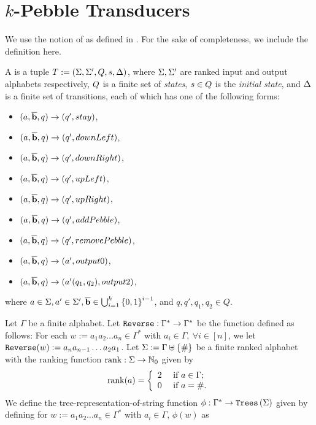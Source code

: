 \section{\texorpdfstring{$k$}{k}-Pebble Transducers}\label{sec:kPebbleTransducers}

We use the notion of  as defined in \cite{MSV2000}. For the sake of completeness, we include the definition here.

\begin{definition}
    A \emph{} is a tuple $T := (\Sigma, \Sigma', Q, s, \Delta)$, where $\Sigma, \Sigma'$ are ranked input and output alphabets respectively, $Q$ is a finite set of \emph{states}, $s \in Q$ is the \emph{initial state}, and $\Delta$ is a finite set of transitions, each of which has one of the following forms:
    \begin{itemize}
        \item $(a, \overline{\textbf{b}}, q) \to (q', stay)$,
        \item $(a, \overline{\textbf{b}}, q) \to (q', downLeft)$,
        \item $(a, \overline{\textbf{b}}, q) \to (q', downRight)$,
        \item $(a, \overline{\textbf{b}}, q) \to (q'
        , upLeft)$,
        \item $(a, \overline{\textbf{b}}, q) \to (q', upRight)$,
        \item $(a, \overline{\textbf{b}}, q) \to (q', addPebble)$,
        \item $(a, \overline{\textbf{b}}, q) \to (q', removePebble)$,
        \item $(a, \overline{\textbf{b}}, q) \to (a', output0)$,
        \item $(a, \overline{\textbf{b}}, q) \to (a'(q_1, q_2), output2)$,
    \end{itemize}
    where $a \in \Sigma, a' \in \Sigma', \overline{\textbf{b}} \in \bigcup_{i=1}^{k}\left\{ 0,1 \right\}^{i-1}$, and $q, q', q_1, q_2 \in Q$.
\end{definition}

Let $\Gamma$ be a finite alphabet. Let $\texttt{Reverse} : \Gamma^* \to \Gamma^*$ be the function defined as follows: For each $w := a_1a_2\dots a_n \in \Gamma^*$ with $a_i \in \Gamma,~\forall i \in [n]$, we let $\texttt{Reverse}(w) := a_na_{n-1}\dots a_2a_1$. Let $\Sigma := \Gamma \uplus \left\{ \# \right\}$ be a finite ranked alphabet with the ranking function $\operatorname{rank} : \Sigma \to \mathbb{N}_0$ given by
\[ \operatorname{rank}(a) = \left\{ \begin{array}{ll} 2 & \mbox{ if } a \in \Gamma;\\ 0 & \mbox{ if } a = \#. \end{array} \right. \]
We define the tree-representation-of-string function $\phi : \Gamma^* \to \texttt{Trees}\left(\Sigma\right)$ given by defining for $w := a_1a_2\dots a_n \in \Gamma^*$ with $a_i \in \Gamma$, $\phi(w)$ as

